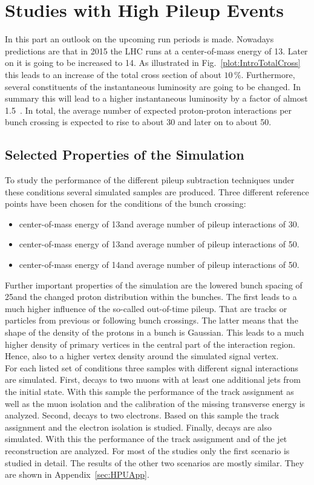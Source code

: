 \chapter{Studies with High Pileup Events \label{sec:HPU}}

In this part an outlook on the upcoming run periods is made. Nowadays predictions are that in 2015 the LHC runs at a center-of-mass energy of 13\TeV. Later on it is going to be increased to 14\TeV. As illustrated in Fig.~\ref{plot:IntroTotalCross} this leads to an increase of the total cross section of about $10\,\%$. Furthermore, several constituents of the instantaneous luminosity are going to be changed. In summary this will lead to a higher instantaneous luminosity by a factor of almost 1.5~\cite{LHCUpgrade}. In total, the average number of expected proton-proton interactions per bunch crossing is expected to rise to about 30 and later on to about 50.

\section{Selected Properties of the Simulation \label{sec:HPUSim}}

To study the performance of the different pileup subtraction techniques under these conditions several simulated samples are produced. Three different reference points have been chosen for the conditions of the bunch crossing:
\begin{itemize}
\item center-of-mass energy of 13\TeV and average number of pileup interactions of 30.
\item center-of-mass energy of 13\TeV and average number of pileup interactions of 50.
\item center-of-mass energy of 14\TeV and average number of pileup interactions of 50.
\end{itemize}
Further important properties of the simulation are the lowered bunch spacing of 25\ns and the changed proton distribution within the bunches. The first leads to a much higher influence of the so-called out-of-time pileup. That are tracks or particles from previous or following bunch crossings. The latter means that the shape of the density of the protons in a bunch is Gaussian. This leads to a much higher density of primary vertices in the central part of the interaction region. Hence, also to a higher vertex density around the simulated signal vertex. \\
For each listed set of conditions three samples with different signal interactions are simulated. First, \Zz decays to two muons with at least one additional jets from the initial state. With this sample the performance of the track assignment as well as the muon isolation and the calibration of the missing transverse energy \ETmiss is analyzed. Second, \Zz decays to two electrons. Based on this sample the track assignment and the electron isolation is studied. Finally, \ttbar decays are also simulated. With this the performance of the track assignment and of the jet reconstruction are analyzed. For most of the studies only the first scenario is studied in detail. The results of the other two scenarios are mostly similar. They are shown in Appendix~\ref{sec:HPUApp}.

